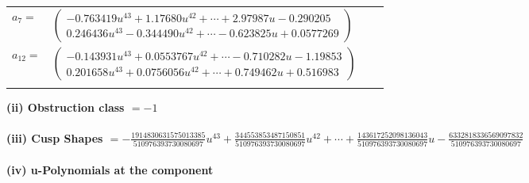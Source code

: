 \documentclass[1p]{elsarticle_modified}
\theoremstyle{definition}
\begin{document}
\begin{tabular}{m{7pt} m{180pt} m{7pt} m{180pt} }
\flushright $a_{7}=$&$\begin{pmatrix}-0.763419 u^{43}+1.17680 u^{42}+\cdots+2.97987 u-0.290205\\0.246436 u^{43}-0.344490 u^{42}+\cdots-0.623825 u+0.0577269\end{pmatrix}$ \\
\flushright $a_{12}=$&$\begin{pmatrix}-0.143931 u^{43}+0.0553767 u^{42}+\cdots-0.710282 u-1.19853\\0.201658 u^{43}+0.0756056 u^{42}+\cdots+0.749462 u+0.516983\end{pmatrix}$\\&\end{tabular}
\flushleft \textbf{(ii) Obstruction class $= -1$}\\~\\
\flushleft \textbf{(iii) Cusp Shapes $= -\frac{1914830631575013385}{510976393730080697} u^{43}+\frac{344553853487150851}{510976393730080697} u^{42}+\cdots+\frac{143617252098136043}{510976393730080697} u-\frac{6332818336569097832}{510976393730080697}$}\\~\\
\newpage\renewcommand{\arraystretch}{1}
\flushleft \textbf{(iv) u-Polynomials at the component}\newline \\
\end{document}
